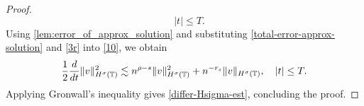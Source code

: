 \begin{proof}
\begin{equation}
\quad |t| \le T.
\label{3r}
\end{equation}
%
%
%
%
%
%
Using \cref{lem:error_of_approx_solution} and
substituting \eqref{total-error-approx-solution} and \eqref{3r}
into \eqref{10}, we obtain
%
%
\begin{equation}
\begin{split}
\frac{1}{2}\frac{d}{dt}\|v\|_{H^\sigma(\mathbb{T})}^2 \lesssim n^{\rho - s}
\|v\|_{H^\sigma(\mathbb{T})}^2 + n^{-r_s}\|v\|_{H^\sigma(\mathbb{T})}, \quad |t| \le T.
\label{200r}
\end{split}
\end{equation}
%
%
Applying Gronwall's inequality gives \eqref{differ-Hsigma-est}, concluding 
the proof. \qquad \qedsymbol
%
%
%
%
%
%
%


\end{proof}
